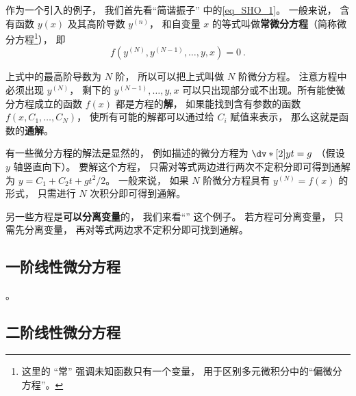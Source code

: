
\begin{issues}
\issueDraft
\end{issues}


作为一个引入的例子， 我们首先看“简谐振子” 中的\autoref{eq_SHO_1}。 一般来说， 含有函数 $y(x)$ 及其高阶导数 $y^{(n)}$， 和自变量 $x$ 的等式叫做\textbf{常微分方程}（简称微分方程\footnote{这里的 “常” 强调未知函数只有一个变量， 用于区别多元微积分中的“偏微分方程”。}）， 即
\begin{equation}
f\left(y^{(N)}, y^{(N-1)}, \dots, y, x\right) = 0~.
\end{equation}

上式中的最高阶导数为 $N$ 阶， 所以可以把上式叫做 $N$ 阶微分方程。 注意方程中必须出现 $y^{(N)}$， 剩下的 $y^{(N-1)}, \dots, y, x$ 可以只出现部分或不出现。所有能使微分方程成立的函数 $f(x)$ 都是方程的\textbf{解}， 如果能找到含有参数的函数 $f(x,C_1, \dots , C_N)$， 使所有可能的解都可以通过给 $C_i$ 赋值来表示， 那么这就是函数的\textbf{通解}。

有一些微分方程的解法是显然的， 例如描述的微分方程为 $\dv*[2]{y}{t} = g$ （假设 $y$ 轴竖直向下）。 要解这个方程， 只需对等式两边进行两次不定积分即可得到通解为 $y = C_1 + C_2 t + gt^2/2$。 一般来说， 如果 $N$ 阶微分方程具有 $y^{(N)} = f(x)$ 的形式， 只需进行 $N$ 次积分即可得到通解。

另一些方程是\textbf{可以分离变量}的， 我们来看“” 这个例子。 若方程可分离变量， 只需先分离变量， 再对等式两边求不定积分即可找到通解。



\subsection{一阶线性微分方程}
。

\subsection{二阶线性微分方程}

